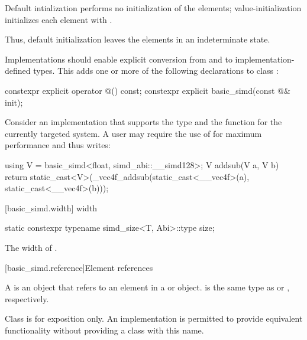 \pnum
Default intialization performs no initialization of the elements; value-initialization initializes each element with . \begin{note}Thus, default initialization leaves the elements in an indeterminate state.\end{note}

\pnum
Implementations should enable explicit conversion from and to implementation-defined types. This adds one or more of the following declarations to class :

\begin{codeblock}
constexpr explicit operator @\impdef@() const;
constexpr explicit basic_simd(const @\impdef@& init);
\end{codeblock}

\begin{example}
  Consider an implementation that supports the type  and the function  for the currently targeted system.
  A user may require the use of  for maximum performance and thus writes:
  \begin{codeblock}
    using V = basic_simd<float, simd_abi::__simd128>;
    V addsub(V a, V b) {
      return static_cast<V>(_vec4f_addsub(static_cast<__vec4f>(a), static_cast<__vec4f>(b)));
    }
  \end{codeblock}
\end{example}

[basic_simd.width]{ width}

\begin{itemdecl}
static constexpr typename simd_size<T, Abi>::type size;
\end{itemdecl}

\begin{itemdescr}
  \pnum\returns
  The width of .
\end{itemdescr}

[basic_simd.reference]{Element references}

\pnum
A  is an object that refers to an element in a  or  object.  is the same type as  or , respectively.

\pnum
Class  is for exposition only. An implementation is permitted to provide equivalent functionality without providing a class with this name.

